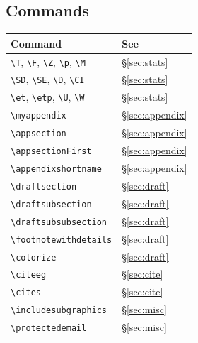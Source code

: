 \documentclass[a4paper,11pt]{article}
\newcommand{\cmd}[1]{\texttt{\textbackslash #1}}
\begin{document}
\subsection*{Commands}
\begin{center}
\begin{tabular}{ll}
\toprule
Command & See \\
\midrule
\cmd{T}, \cmd{F}, \cmd{Z}, \cmd{p}, \cmd{M} & \S\ref{sec:stats} \\
\cmd{SD}, \cmd{SE}, \cmd{D}, \cmd{CI}        & \S\ref{sec:stats} \\
\cmd{et}, \cmd{etp}, \cmd{U}, \cmd{W}        & \S\ref{sec:stats} \\
\cmd{myappendix}           & \S\ref{sec:appendix} \\
\cmd{appsection}           & \S\ref{sec:appendix} \\
\cmd{appsectionFirst}      & \S\ref{sec:appendix} \\
\cmd{appendixshortname}    & \S\ref{sec:appendix} \\
\cmd{draftsection}         & \S\ref{sec:draft} \\
\cmd{draftsubsection}      & \S\ref{sec:draft} \\
\cmd{draftsubsubsection}   & \S\ref{sec:draft} \\
\cmd{footnotewithdetails}  & \S\ref{sec:draft} \\
\cmd{colorize}             & \S\ref{sec:draft} \\
\cmd{citeeg}               & \S\ref{sec:cite} \\
\cmd{cites}                & \S\ref{sec:cite} \\
\cmd{includesubgraphics}   & \S\ref{sec:misc} \\
\cmd{protectedemail}       & \S\ref{sec:misc} \\
\bottomrule
\end{tabular}
\end{center}

\printindex
\end{document}
